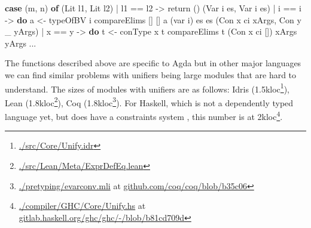 \documentclass[
  sigconf,
  screen,
  review]{acmart}
\newenvironment{Shaded}{}{}
\newcommand{\DataTypeTok}[1]{\textcolor[rgb]{0.56,0.13,0.00}{#1}}
\newcommand{\FunctionTok}[1]{\textcolor[rgb]{0.02,0.16,0.49}{#1}}
\newcommand{\KeywordTok}[1]{\textcolor[rgb]{0.00,0.44,0.13}{\textbf{#1}}}
\newcommand{\NormalTok}[1]{#1}
\newcommand{\OperatorTok}[1]{\textcolor[rgb]{0.40,0.40,0.40}{#1}}
\newcommand{\OtherTok}[1]{\textcolor[rgb]{0.00,0.44,0.13}{#1}}
\begin{document}
\begin{Shaded}
\begin{Highlighting}[]
\KeywordTok{case}\NormalTok{ (m, n) }\KeywordTok{of}
\NormalTok{  (}\DataTypeTok{Lit}\NormalTok{ l1, }\DataTypeTok{Lit}\NormalTok{ l2) }\OperatorTok{|}\NormalTok{ l1 }\OperatorTok{==}\NormalTok{ l2 }\OtherTok{{-}\textgreater{}} \FunctionTok{return}\NormalTok{ ()}
\NormalTok{  (}\DataTypeTok{Var}\NormalTok{ i es, }\DataTypeTok{Var}\NormalTok{ i\textquotesingle{} es\textquotesingle{}) }\OperatorTok{|}\NormalTok{ i }\OperatorTok{==}\NormalTok{ i\textquotesingle{} }\OtherTok{{-}\textgreater{}} \KeywordTok{do}
\NormalTok{      a }\OtherTok{\textless{}{-}}\NormalTok{ typeOfBV i}
\NormalTok{      compareElims [] [] a (var i) es es\textquotesingle{}}
\NormalTok{  (}\DataTypeTok{Con}\NormalTok{ x ci xArgs, }\DataTypeTok{Con}\NormalTok{ y \_ yArgs) }\OperatorTok{|}\NormalTok{ x }\OperatorTok{==}\NormalTok{ y }\OtherTok{{-}\textgreater{}} \KeywordTok{do}
\NormalTok{      t\textquotesingle{} }\OtherTok{\textless{}{-}}\NormalTok{ conType x t}
\NormalTok{      compareElims t\textquotesingle{} (}\DataTypeTok{Con}\NormalTok{ x ci []) xArgs yArgs}
  \OperatorTok{...}
\end{Highlighting}
\end{Shaded}

The functions described above are specific to Agda but in other major
languages we can find similar problems with unifiers being large modules
that are hard to understand. The sizes of modules with unifiers are as
follows: Idris (1.5kloc\footnote{\href{https://github.com/idris-lang/Idris2/blob/102d7ebc18a9e881021ed4b05186cccda5274cbe/src/Core/Unify.idr}{./src/Core/Unify.idr}}),
Lean (1.8kloc\footnote{\href{https://github.com/leanprover/lean4/blob/75252d2b85df8cb9231020a556a70f6d736e7ee5/src/Lean/Meta/ExprDefEq.lean}{./src/Lean/Meta/ExprDefEq.lean}}),
Coq (1.8kloc\footnote{\href{https://github.com/coq/coq/blob/b35c06c3ab3ed4911311b4a9428a749658d3eff1/pretyping/evarconv.mli}{./pretyping/evarconv.mli}
  at
  \href{github.com/coq/coq/blob/b35c06c3ab3ed4911311b4a9428a749658d3eff1/}{github.com/coq/coq/blob/b35c06}}).
For Haskell, which is not a dependently typed language yet, but does
have a constraints system
\citep{peytonjonesTypeInferenceConstraint2019}, this number is at
2kloc\footnote{\href{https://gitlab.haskell.org/ghc/ghc/-/blob/b81cd709df8054b8b98ac05d3b9affcee9a8b840/compiler/GHC/Core/Unify.hs}{./compiler/GHC/Core/Unify.hs}
  at
  \href{https://gitlab.haskell.org/ghc/ghc/-/blob/b81cd709df8054b8b98ac05d3b9affcee9a8b840}{gitlab.haskell.org/ghc/ghc/-/blob/b81cd709d}}.
\end{document}
